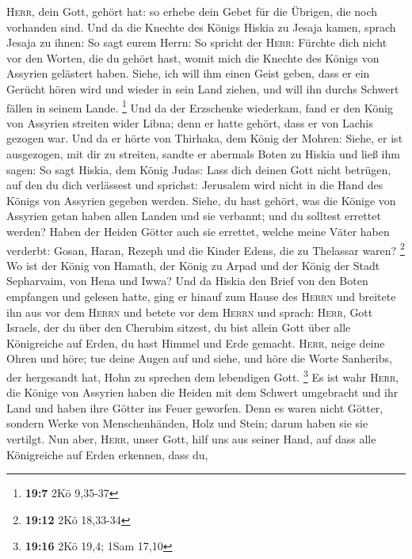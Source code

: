 \textsc{Herr}, dein Gott, gehört hat: so erhebe dein Gebet für die
Übrigen, die noch vorhanden sind.  Und da die Knechte des
Königs Hiskia zu Jesaja kamen,  sprach Jesaja zu ihnen: So
sagt eurem Herrn: So spricht der \textsc{Herr}: Fürchte dich nicht vor
den Worten, die du gehört hast, womit mich die Knechte des Königs von
Assyrien gelästert haben.  Siehe, ich will ihm einen Geist
geben, dass er ein Gerücht hören wird und wieder in sein Land ziehen,
und will ihn durchs Schwert fällen in seinem Lande. \footnote{\textbf{19:7}
  2Kö 9,35-37}  Und da der Erzschenke wiederkam, fand er
den König von Assyrien streiten wider Libna; denn er hatte gehört, dass
er von Lachis gezogen war.  Und da er hörte von Thirhaka,
dem König der Mohren: Siehe, er ist ausgezogen, mit dir zu streiten,
sandte er abermals Boten zu Hiskia und ließ ihm sagen: 
So sagt Hiskia, dem König Judas: Lass dich deinen Gott nicht betrügen,
auf den du dich verlässest und sprichst: Jerusalem wird nicht in die
Hand des Königs von Assyrien gegeben werden.  Siehe, du
hast gehört, was die Könige von Assyrien getan haben allen Landen und
sie verbannt; und du solltest errettet werden?  Haben der
Heiden Götter auch sie errettet, welche meine Väter haben verderbt:
Gosan, Haran, Rezeph und die Kinder Edens, die zu Thelassar waren?
\footnote{\textbf{19:12} 2Kö 18,33-34}  Wo ist der König
von Hamath, der König zu Arpad und der König der Stadt Sepharvaim, von
Hena und Iwwa?  Und da Hiskia den Brief von den Boten
empfangen und gelesen hatte, ging er hinauf zum Hause des \textsc{Herrn}
und breitete ihn aus vor dem \textsc{Herrn}  und betete
vor dem \textsc{Herrn} und sprach: \textsc{Herr}, Gott Israels, der du
über den Cherubim sitzest, du bist allein Gott über alle Königreiche auf
Erden, du hast Himmel und Erde gemacht.  \textsc{Herr},
neige deine Ohren und höre; tue deine Augen auf und siehe, und höre die
Worte Sanheribs, der hergesandt hat, Hohn zu sprechen dem lebendigen
Gott. \footnote{\textbf{19:16} 2Kö 19,4; 1Sam 17,10}  Es
ist wahr \textsc{Herr}, die Könige von Assyrien haben die Heiden mit dem
Schwert umgebracht und ihr Land  und haben ihre Götter
ins Feuer geworfen. Denn es waren nicht Götter, sondern Werke von
Menschenhänden, Holz und Stein; darum haben sie sie vertilgt.
 Nun aber, \textsc{Herr}, unser Gott, hilf uns aus seiner
Hand, auf dass alle Königreiche auf Erden erkennen, dass du,
